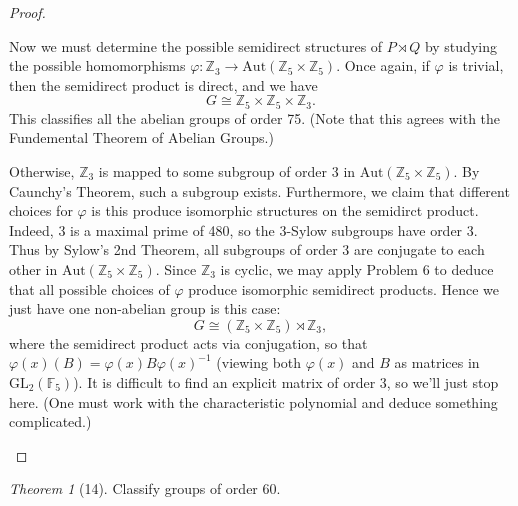 \documentclass[12pt]{article}
\theoremstyle{remark}
\theoremstyle{named}
\newtheorem*{theorem}{Theorem}
\newcommand{\Aut}{\text{Aut}}
\begin{document}
\begin{proof}
\begin{enumerate}
        Now we must determine the possible semidirect structures of \(P \rtimes Q\) by studying the possible homomorphisms \(\varphi : \mathbb Z_3 \to \Aut(\mathbb Z_5 \times \mathbb Z_5)\). Once again, if \(\varphi\) is trivial, then the semidirect product is direct, and we have 
        \[G \cong \mathbb Z_5 \times \mathbb Z_5 \times \mathbb Z_3.\]
        This classifies all the abelian groups of order 75. (Note that this agrees with the Fundemental Theorem of Abelian Groups.)

        Otherwise, \(\mathbb Z_3\) is mapped to some subgroup of order 3 in \(\Aut(\mathbb Z_5 \times \mathbb Z_5)\). By Caunchy's Theorem, such a subgroup exists. Furthermore, we claim that different choices for \(\varphi\) is this produce isomorphic structures on the semidirct product. 
        Indeed, 3 is a maximal prime of 480, so the 3-Sylow subgroups have order 3. Thus by Sylow's 2nd Theorem, all subgroups of order 3 are conjugate to each other in \(\Aut(\mathbb Z_5 \times \mathbb Z_5)\). Since \(\mathbb Z_3\) is cyclic, we may apply Problem 6 to deduce that all possible choices of \(\varphi\) produce isomorphic semidirect products. Hence we just have one non-abelian group is this case:
        \[G \cong (\mathbb Z_5 \times \mathbb Z_5) \rtimes \mathbb Z_3,\]
        where the semidirect product acts via conjugation, so that \(\varphi(x)(B) = \varphi(x) B \varphi(x)^{-1}\) (viewing both \(\varphi(x)\) and \(B\) as matrices in \(\text{GL}_2(\mathbb F_5)\)). It is difficult to find an explicit matrix of order 3, so we'll just stop here. (One must work with the characteristic polynomial and deduce something complicated.)
    \end{enumerate}
\end{proof}

\begin{theorem}[14]
    Classify groups of order 60.
\end{theorem}
\end{document}
